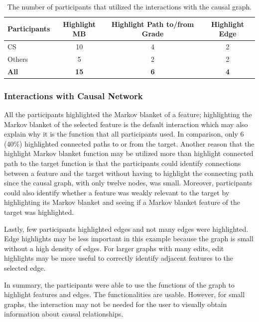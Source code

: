 \begin{table}[]
\centering
\begin{tabular}{lccc}
\hline
Participants & Highlight MB & Highlight Path to/from Grade & Highlight Edge \\ \hline
CS           & 10           & 4                           &   2             \\
Others       & 5            & 2                            &  2              \\ \hline
\textbf{All} & \textbf{15}  & \textbf{6}                  &  \textbf{4}        \\ \hline
\end{tabular}
\caption{The number of participants that utilized the interactions with the causal graph. }
\label{GraphInteractions}
\end{table}

\subsubsection { Interactions with Causal Network }
All the participants highlighted the Markov blanket of a feature; highlighting the Markov blanket of the selected feature is the default interaction which may also explain why it is the function that all participants used. In comparison, only 6 (40\%) highlighted connected paths to or from the target. Another reason that the highlight Markov blanket function may be utilized more than highlight connected path to the target function is that the participants could identify connections between a feature and the target without having to highlight the connecting path since the causal graph, with only twelve nodes, was small. Moreover, participants could also identify whether a feature was weakly relevant to the target by highlighting its Markov blanket and seeing if a Markov blanket feature of the target was highlighted.

Lastly, few participants highlighted edges and not many edges were highlighted. Edge highlights may be less important in this example because the graph is small without a high density of edges. For larger graphs with many edits, edit highlights may be more useful to correctly identify adjacent features to the selected edge.

In summary, the participants were able to use the functions of the graph to highlight features and edges. The functionalities are usable. However, for small graphs, the interaction may not be needed for the user to visually obtain information about causal relationships.

